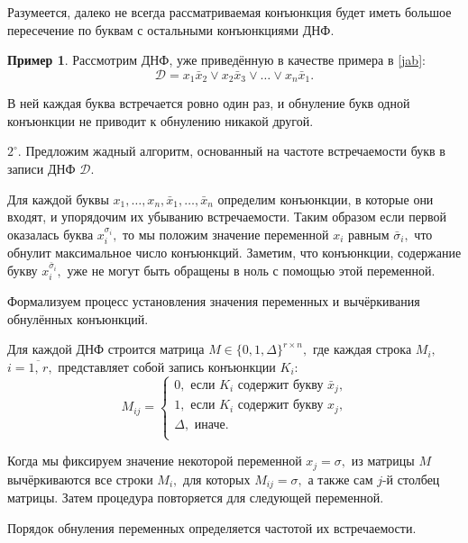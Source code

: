 \documentclass[12pt,a4paper,oneside,fleqn,leqno]{article}
\theoremstyle{definition}
\newtheorem{example}{Пример}%
\begin{document}
		Разумеется, далеко не всегда рассматриваемая конъюнкция будет иметь большое пересечение по буквам с остальными конъюнкциями ДНФ.\par
		\begin{example}
				Рассмотрим ДНФ, уже приведённую в качестве примера в \ref{jab}:
				$$
					\mathcal{D} = x_1\bar{x}_2 \vee x_2\bar{x}_3 \vee \ldots \vee x_n \bar{x}_1.
				$$\par
				В ней каждая буква встречается ровно один раз, и обнуление букв одной конъюнкции не приводит к обнулению никакой другой.
		\end{example}\par
		$2^{\circ}.$ Предложим жадный алгоритм, основанный на частоте встречаемости букв в записи ДНФ $\mathcal{D}.$\par
		Для каждой буквы $x_1,\ldots, x_n,\bar{x}_1,\ldots,\bar{x}_n$ определим конъюнкции, в которые они входят, и упорядочим их убыванию встречаемости. Таким образом если первой оказалась буква $x_i^{\sigma_i},$ то мы положим значение переменной $x_i$ равным $\bar{\sigma}_i,$ что обнулит максимальное число конъюнкций. Заметим, что конъюнкции, содержание букву $x_i^{\bar{\sigma}_i},$ уже не могут быть обращены в ноль с помощью этой переменной.\par
		Формализуем процесс установления значения переменных и вычёркивания обнулённых конъюнкций.\par
		Для каждой ДНФ строится матрица $M \in \{0, 1, \Delta\}^{r \times n},$ где каждая строка $M_i,$\\$i=\overline{1,\,r},$ представляет собой запись конъюнкции $K_i$:
			$$
				M_{ij} = \begin{cases}
					0,\text{ если $K_i$ содержит букву $\bar{x}_j$,}\\
					1,\text{ если $K_i$ содержит букву $x_j$,}\\
					\Delta,\text{ иначе.}\\
				\end{cases}
			$$\par
			Когда мы фиксируем значение некоторой переменной $x_j = \sigma,$ из матрицы $M$ вычёркиваются все строки $M_i,$ для которых $M_{ij} = \sigma,$ а также сам $j$-й столбец матрицы. Затем процедура повторяется для следующей переменной.\par
			Порядок обнуления переменных определяется частотой их встречаемости.\par
\end{document}
